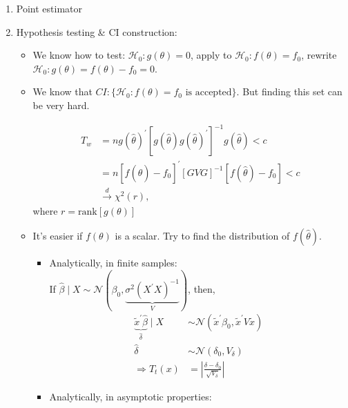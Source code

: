 \begin{enumerate}
    \item Point estimator
    \item Hypothesis testing \& CI construction:
    \begin{itemize}
        \item We know how to test: $\mathcal{H}_0: g(\theta) = 0$, apply to $\mathcal{H}_0: f(\theta) = f_0$, rewrite $\mathcal{H}_0: g(\theta) = f(\theta) - f_0 = 0$.
        \item We know that $CI: \{ \mathcal{H}_0: f(\theta) = f_0 \text{ is accepted} \}$.
              But finding this set can be very hard.
              \begin{eg}
                \begin{align*}
                    T_w &= n g(\hat{\theta})^{\prime} [g(\hat{\theta}) g(\hat{\theta})^{\prime}]^{-1} g(\hat{\theta}) < c \\
                    &= n\left[f(\hat{\theta})-f_0\right]^{\prime} \left[GVG\right]^{-1} \left[f(\hat{\theta})-f_0\right] < c \\
                    & \xrightarrow{d} \chi^2 (r),
                \end{align*}
                where $r = \text{rank} [g(\theta)]$
              \end{eg}
        \item It's easier if $f(\theta)$ is a scalar. Try to find the distribution of $f(\hat{\theta})$.
        \begin{itemize}
            \item Analytically, in finite samples: \\
                If $\hat{\beta} \mid X \sim \mathcal{N} \left(\beta_0, \underset{V}{\underbrace{\sigma^2 (X^{\prime} X)^{-1}}}\right)$, then,
                \begin{align*}
                    \underset{\hat{\delta}}{\underbrace{\tilde{x}^{\prime} \hat{\beta}}} \mid X &\sim \mathcal{N}\left(\tilde{x}^{\prime} \beta_0, \tilde{x}^{\prime} V\tilde{x}\right) \\
                    \hat{\delta} &\sim \mathcal{N} (\delta_0, V_{\delta}) \\
                    \Rightarrow T_t(x) &= \left\vert \frac{\delta - \delta_0}{\sqrt{V_{\delta}} } \right\vert 
                \end{align*}
            \item Analytically, in asymptotic properties:
                \begin{eg}

\end{eg}
\end{itemize}
\end{itemize}
\end{enumerate}
